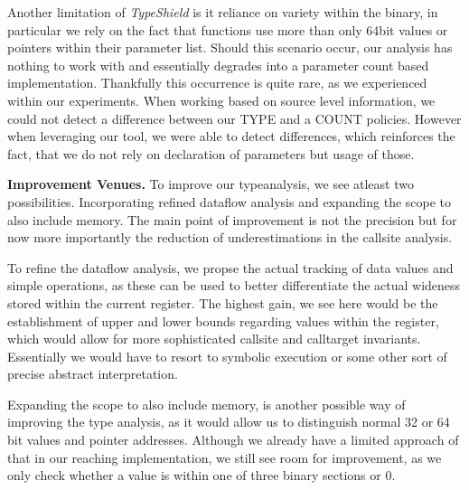 Another limitation of \textit{TypeShield} is it reliance on variety within the binary, in particular we rely on
the fact that functions use more than only 64bit values or pointers within their parameter list. Should this
scenario occur, our analysis has nothing to work with and essentially degrades into a parameter count based
implementation. Thankfully this occurrence is quite rare, as we experienced within our experiments. When working
based on source level information, we could not detect a difference between our TYPE and a COUNT policies. 
However when leveraging our tool, we were able to detect differences, which reinforces the fact, that we do 
not rely on declaration of parameters but usage of those.

\textbf{Improvement Venues.}
\label{section:venuesimp}
To improve our typeanalysis, we see atleast two possibilities. Incorporating refined dataflow analysis and 
expanding the scope to also include memory. The main point of improvement is not the precision but for now 
more importantly the reduction of underestimations in the callsite analysis.

To refine the dataflow analysis, we propse the actual tracking of data values and simple operations, as these
can be used to better differentiate the actual wideness stored within the current register. The highest gain, 
we see here would be the establishment of upper and lower bounds regarding values within the register, which 
would allow for more sophisticated callsite and calltarget invariants. Essentially we would have to resort 
to symbolic execution or some other sort of precise abstract interpretation.

Expanding the scope to also include memory, is another possible way of improving the type analysis, as it 
would allow us to distinguish normal 32 or 64 bit values and pointer addresses. Although we already have a 
limited approach of that in our reaching implementation, we still see room for improvement, as we only check
whether a value is within one of three binary sections or 0.
